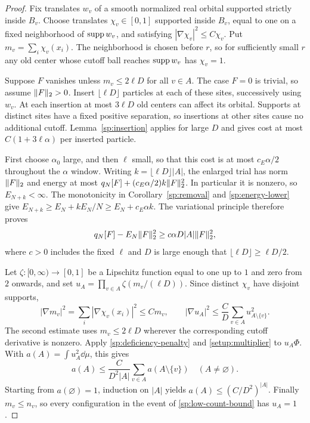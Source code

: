 \begin{proof}
Fix translates $w_v$ of a smooth normalized real orbital supported
strictly inside $B_v$.  Choose translates $\chi_v\in[0,1]$ supported
inside $B_v$, equal to one on a fixed neighborhood of $\operatorname{supp} w_v$,
and satisfying $|\nabla\chi_v|^2\le C\chi_v$.  Put
$m_v=\sum_i\chi_v(x_i)$.  The neighborhood is chosen before $r$,
so for sufficiently small $r$ any old center whose cutoff ball reaches
$\operatorname{supp} w_v$ has $\chi_v=1$.

Suppose $F$ vanishes unless $m_v\le2\ell D$ for all $v\in A$.
The case $F=0$ is trivial, so assume $\lVert F\rVert_2>0$.
Insert $\lfloor\ell D\rfloor$ particles at each of these sites,
successively using $w_v$.  At each insertion at most $3\ell D$
old centers can affect its orbital.  Supports at distinct sites have a
fixed positive separation, so insertions at other sites cause no additional
cutoff.  Lemma~\ref{sp:insertion} applies for large $D$ and gives
cost at most $C(1+3\ell\alpha)$ per inserted particle.

First choose $\alpha_0$ large, and then $\ell$ small, so that this
cost is at most $c_E\alpha/2$ throughout the $\alpha$ window.
Writing $k=\lfloor\ell D\rfloor|A|$, the enlarged trial has norm
$\lVert F\rVert_2$ and energy at most $q_N[F]+(c_E\alpha/2)k\lVert F\rVert_2^2$.
In particular it is nonzero, so $E_{N+k}<\infty$.
The monotonicity in Corollary~\ref{sp:removal} and
\eqref{sp:energy-lower} give
$E_{N+k}\ge E_N+kE_N/N\ge E_N+c_E\alpha k$.
The variational principle therefore proves
\begin{equation}\label{sp:deficiency-penalty}
 q_N[F]-E_N\lVert F\rVert_2^2
       \ge c\alpha D|A|\lVert F\rVert_2^2,
\end{equation}
where $c>0$ includes the fixed $\ell$ and $D$ is large enough that
$\lfloor\ell D\rfloor\ge\ell D/2$.

Let $\zeta:[0,\infty)\to[0,1]$ be a Lipschitz function equal to
one up to $1$ and zero from $2$ onwards, and set
$u_A=\prod_{v\in A}\zeta(m_v/(\ell D))$.
Since distinct $\chi_v$ have disjoint supports,
\[
 |\nabla m_v|^2=\sum_i|\nabla\chi_v(x_i)|^2\le Cm_v,
 \qquad
 |\nabla u_A|^2\le\frac C D
               \sum_{v\in A}u_{A\setminus\{v\}}^2.
\]
The second estimate uses $m_v\le2\ell D$ wherever the corresponding
cutoff derivative is nonzero.  Apply \eqref{sp:deficiency-penalty}
and \eqref{setup:multiplier} to $u_A\Phi$.  With
$a(A)=\int u_A^2\dd\mu$, this gives
\[
 a(A)\le\frac{C}{D^2|A|}\sum_{v\in A}a(A\setminus\{v\})
 \quad(A\ne\varnothing).
\]
Starting from $a(\varnothing)=1$, induction on $|A|$ yields
$a(A)\le(C/D^2)^{|A|}$.  Finally $m_v\le n_v$, so every
configuration in the event of \eqref{sp:low-count-bound} has $u_A=1$.
\end{proof}

